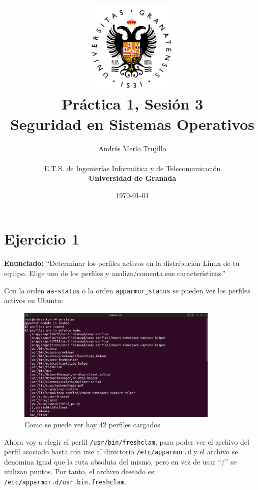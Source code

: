 \documentclass{article}
\title{
\includegraphics[width=1.75in]{imagenes/UGR-Logo.png} \\
\vspace*{1in}
\textbf{Práctica 1, Sesión 3} \\
Seguridad en Sistemas Operativos \\
\vspace*{0.5in}}
\author{Andrés Merlo Trujillo \\
\vspace*{0.5in} \\
E.T.S. de Ingenierías Informática y de Telecomunicación \\
\textbf{Universidad de Granada}} \date{\today}
\begin{document}
\begin{titlingpage}
    \maketitle
\end{titlingpage}

\tableofcontents

\newpage

\pagestyle{fancy}

%
\section{Ejercicio 1}
\textbf{Enunciado: }``Determinar los perfiles activos en la distribución Linux de tu equipo. Elige uno de los perfiles y analiza/comenta sus características.''

\bigskip

Con la orden \verb|aa-status| o la orden \verb|apparmor_status| se pueden ver los perfiles activos en Ubuntu:

\begin{figure}[H]
    \centering
    \includegraphics[width=0.85\textwidth]{imagenes/s3-aa-status.png}
    \caption{Como se puede ver hay 42 perfiles cargados.}
\end{figure}


Ahora voy a elegir el perfil \verb|/usr/bin/freshclam|, para poder ver el archivo del perfil asociado basta con irse al directorio \verb|/etc/apparmor.d| y el archivo se denomina igual que la ruta absoluta del mismo, pero en vez de usar ``/'' se utilizan puntos. Por tanto, el archivo deseado es: \verb|/etc/apparmor.d/usr.bin.freshclam|.
\end{document}
